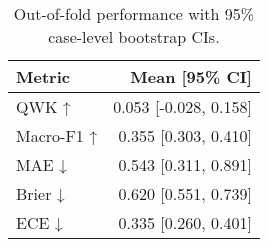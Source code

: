 \begin{table}
\caption{Out-of-fold performance with 95\% case-level bootstrap CIs.}
\label{tab:oof-performance}
\begin{tabular}{lr}
\toprule
Metric & Mean [95\% CI] \\
\midrule
QWK ↑ & 0.053 [-0.028, 0.158] \\
Macro-F1 ↑ & 0.355 [0.303, 0.410] \\
MAE ↓ & 0.543 [0.311, 0.891] \\
Brier ↓ & 0.620 [0.551, 0.739] \\
ECE ↓ & 0.335 [0.260, 0.401] \\
\bottomrule
\end{tabular}
\end{table}
